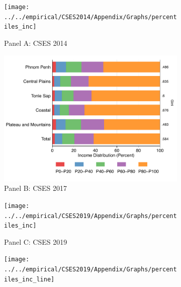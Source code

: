 \documentclass[11pt,letterpaper]{article}
\begin{document}
\begin{figure}[H]
	\vspace{-1em}
	\caption{Household income distribution through the Gini index}
	\label{fig:m4}
	\begin{subfigure}[b]{0.77\linewidth} 
		\caption*{Panel A: CSES 2014}\vspace{-.5em}
		\label{fig:m3a}
		\texttt{[image: ../../empirical/CSES2014/Appendix/Graphs/percentiles\_inc]}
	\end{subfigure}%
	\hfil
	\begin{subfigure}[b]{0.77\linewidth}
		\caption*{Panel B: CSES 2017} \vspace{-.5em}
		\label{fig:m3b}
		\includegraphics[width=1\linewidth]{../../empirical/CSES2017/Appendix/Graphs/percentiles_inc}
	\end{subfigure}
	\hfil
	\begin{subfigure}[b]{0.77\linewidth}
		\caption*{Panel C: CSES 2019} \vspace{-.5em}
		\label{fig:m3c}
		\texttt{[image: ../../empirical/CSES2019/Appendix/Graphs/percentiles\_inc]}
	\end{subfigure}
	\hfil
	\begin{subfigure}[b]{0.77\linewidth}
		\raggedleft 
		\texttt{[image: ../../empirical/CSES2019/Appendix/Graphs/percentiles\_inc\_line]}
	\end{subfigure}
	\vspace{-1em}
	
\end{figure}
\end{document}

